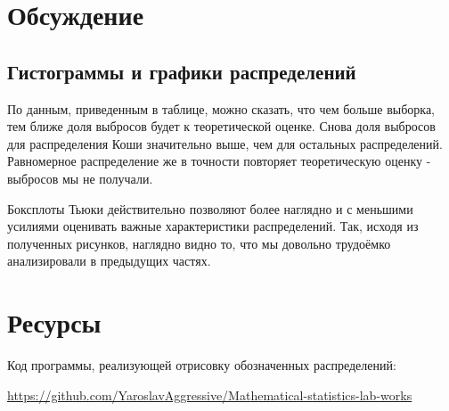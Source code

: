 \documentclass[a4paper]{article}
\begin{document}
    
\section{Обсуждение}
    \subsection{Гистограммы и графики распределений}
        По данным, приведенным в таблице, можно сказать, что чем больше выборка, тем ближе доля выбросов будет к теоретической оценке. Снова доля
выбросов для распределения Коши значительно выше, чем для остальных
распределений. Равномерное распределение же в точности повторяет теоретическую оценку - выбросов мы не получали.

        Боксплоты Тьюки действительно позволяют более наглядно и с меньшими
усилиями оценивать важные характеристики распределений. Так, исходя
из полученных рисунков, наглядно видно то, что мы довольно трудоёмко
анализировали в предыдущих частях.
\section{Ресурсы}
    \begin{spacing}{2.5}
        Код программы, реализующей отрисовку обозначенных распределений:
        
        \href{https://github.com/YaroslavAggressive/Mathematical-statistics-lab-works}{https://github.com/YaroslavAggressive/Mathematical-statistics-lab-works}
    \end{spacing}
\end{document}
